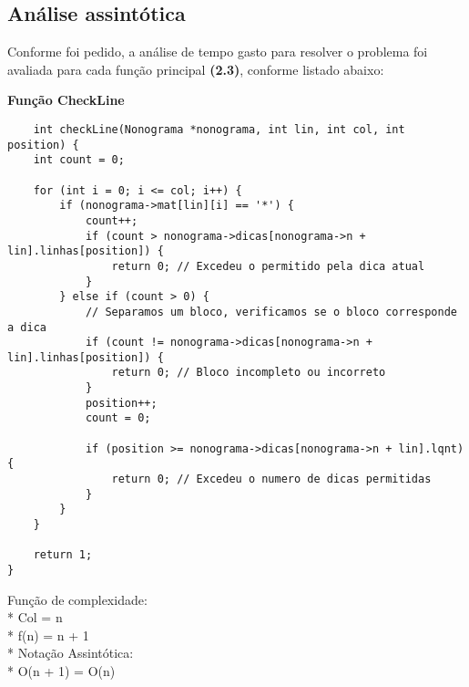 \documentclass{article}
\begin{document}
\subsection{Análise assintótica}

Conforme foi pedido, a análise de tempo gasto para resolver o problema foi avaliada para cada função principal \textbf{(2.3)}, conforme listado abaixo:

\begin{center}
\textbf{Função CheckLine}
\end{center}

\begin{lstlisting}
    int checkLine(Nonograma *nonograma, int lin, int col, int position) {
    int count = 0;

    for (int i = 0; i <= col; i++) {
        if (nonograma->mat[lin][i] == '*') {
            count++;
            if (count > nonograma->dicas[nonograma->n + lin].linhas[position]) {
                return 0; // Excedeu o permitido pela dica atual
            }
        } else if (count > 0) {
            // Separamos um bloco, verificamos se o bloco corresponde a dica
            if (count != nonograma->dicas[nonograma->n + lin].linhas[position]) {
                return 0; // Bloco incompleto ou incorreto
            }
            position++;
            count = 0;

            if (position >= nonograma->dicas[nonograma->n + lin].lqnt) {
                return 0; // Excedeu o numero de dicas permitidas
            }
        }
    }

    return 1;
}
\end{lstlisting}


\begin{center}
    Função de complexidade:\\
    * Col = n\\
    * f(n) = n + 1\\
    * Notação Assintótica:\\
    * O(n + 1) = O(n)\\
\end{center}
\end{document}
